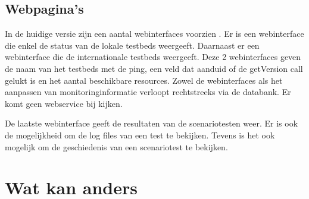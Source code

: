 \subsection{Webpagina\rq s}
\npar
In de huidige versie zijn een aantal webinterfaces voorzien\citep{FED4FIRE-doc} .
Er is een webinterface die enkel de status van de lokale testbeds weergeeft. Daarnaast er een webinterface die de internationale testbeds weergeeft. 
Deze 2 webinterfaces geven de naam van het testbeds met de ping, een veld dat aanduid of de getVersion call gelukt is en het aantal beschikbare resources.
\npar
Zowel de webinterfaces als het aanpassen van monitoringinformatie verloopt rechtstreeks via de databank. Er komt geen webservice bij kijken.

\npar
De laatste webinterface geeft de resultaten van de scenariotesten weer. Er is ook de mogelijkheid om de log files van een test te bekijken. Tevens is het ook mogelijk om de geschiedenis van een scenariotest te bekijken.

\clearpage
\section{Wat kan anders}
